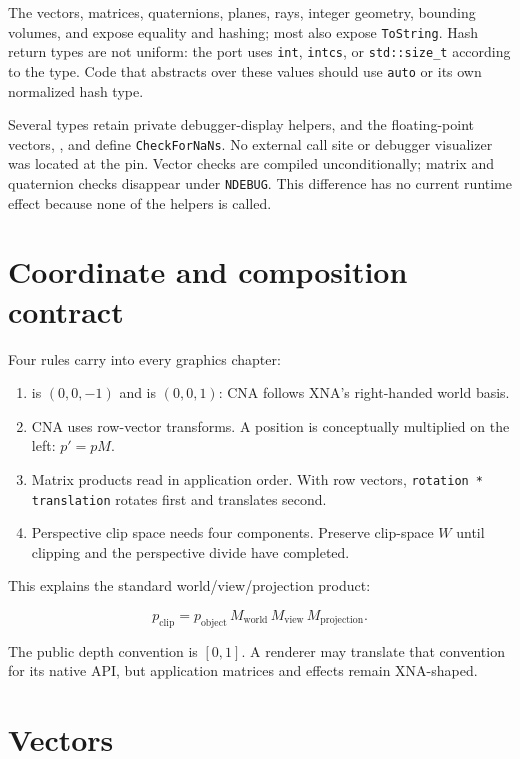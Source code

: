 The vectors, matrices, quaternions, planes, rays, integer geometry, bounding volumes, and
 expose equality and hashing; most also expose \texttt{ToString}. Hash return
types are not uniform: the port uses \texttt{int}, \texttt{intcs}, or
\texttt{std::size\_t} according to the type. Code that abstracts over these values should use
\texttt{auto} or its own normalized hash type.

Several types retain private debugger-display helpers, and the floating-point vectors,
, and  define \texttt{CheckForNaNs}. No external call site
or debugger visualizer was located at the pin. Vector checks are compiled unconditionally;
matrix and quaternion checks disappear under \texttt{NDEBUG}. This difference has no current
runtime effect because none of the helpers is called.

\section{Coordinate and composition contract}

Four rules carry into every graphics chapter:

\begin{enumerate}
  \item {} is $(0,0,-1)$ and
         is $(0,0,1)$: CNA follows XNA's right-handed world basis.
  \item CNA uses row-vector transforms. A position is conceptually multiplied on the left:
        $p' = pM$.
  \item Matrix products read in application order. With row vectors,
        \texttt{rotation * translation} rotates first and translates second.
  \item Perspective clip space needs four components. Preserve clip-space $W$ until clipping and
        the perspective divide have completed.
\end{enumerate}

This explains the standard world/view/projection product:

\[
  p_{\mathrm{clip}} = p_{\mathrm{object}}\,M_{\mathrm{world}}\,
                      M_{\mathrm{view}}\,M_{\mathrm{projection}} .
\]

The public depth convention is $[0,1]$. A renderer may translate that convention for its native
API, but application matrices and effects remain XNA-shaped.

\section{Vectors}

